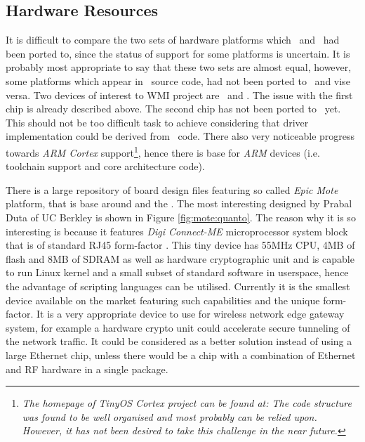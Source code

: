 \subsection{Hardware Resources}

  It is difficult to compare the two sets of hardware platforms which
 \TinyOS\ and \Contiki\ had been ported to, since the status of support
 for some platforms is uncertain. It is probably most appropriate to
 say that these two sets are almost equal, however, some platforms
 which appear in \Contiki\ source code, had not been ported to \TinyOS\
 and vise versa. Two devices of interest to WMI project are \RFA\ and
 \MCX. The issue with the first chip is already described above.
 The second chip has not been ported to \TinyOS\ yet. This should not
 be too difficult task to achieve considering that driver implementation
 could be derived from \Contiki\ code. There also very noticeable
 progress towards \emph{ARM Cortex} support\footnote{\emph{The homepage
 of TinyOS Cortex project can be found at:
 The code structure was found to be well organised and most probably
 can be relied upon. However, it has not been desired to take this
 challenge in the near future.}}, hence there is base for \emph{ARM}
 devices (i.e. toolchain support and core architecture code).
 

  There is a large repository of board design files featuring so called
 \emph{Epic Mote} platform, that is base around \Chip{CC2420} and the
 \Chip{MSP430} \cite{links:epic}. The most interesting designed by
 Prabal Duta of UC Berkley \cite{duta:homepage} is shown in Figure
 \ref{fig:mote:quanto}. The reason why it is so interesting is because
 it features \emph{Digi Connect-ME} microprocessor system block that is
 of standard RJ45 form-factor \cite{links:digi:cme}. This tiny device
 has 55MHz \Chip{ARM7TDMI} CPU, 4MB of flash and 8MB of SDRAM as well as
 hardware cryptographic unit and is capable to run Linux kernel and a
 small subset of standard software in userspace, hence the advantage of
 scripting languages can be utilised. Currently it is the smallest
 device available on the market featuring such capabilities and
 the unique form-factor. It is a very appropriate device to use for
 wireless network edge gateway system, for example a hardware crypto
 unit could accelerate secure tunneling of the network traffic. It
 could be considered as a better solution instead of using a large
 Ethernet chip, unless there would be a chip with a combination of
 Ethernet and RF hardware in a single package.

